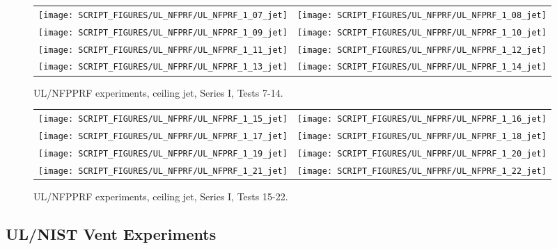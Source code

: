\newpage

\begin{figure}[p]
\begin{tabular*}{\textwidth}{l@{\extracolsep{\fill}}r}
\texttt{[image: SCRIPT\_FIGURES/UL\_NFPRF/UL\_NFPRF\_1\_07\_jet]} &
\texttt{[image: SCRIPT\_FIGURES/UL\_NFPRF/UL\_NFPRF\_1\_08\_jet]} \\
\texttt{[image: SCRIPT\_FIGURES/UL\_NFPRF/UL\_NFPRF\_1\_09\_jet]} &
\texttt{[image: SCRIPT\_FIGURES/UL\_NFPRF/UL\_NFPRF\_1\_10\_jet]} \\
\texttt{[image: SCRIPT\_FIGURES/UL\_NFPRF/UL\_NFPRF\_1\_11\_jet]} &
\texttt{[image: SCRIPT\_FIGURES/UL\_NFPRF/UL\_NFPRF\_1\_12\_jet]} \\
\texttt{[image: SCRIPT\_FIGURES/UL\_NFPRF/UL\_NFPRF\_1\_13\_jet]} &
\texttt{[image: SCRIPT\_FIGURES/UL\_NFPRF/UL\_NFPRF\_1\_14\_jet]}
\end{tabular*}
\caption{UL/NFPPRF experiments, ceiling jet, Series I, Tests 7-14.}
\label{UL_NFPRF_jet_2}
\end{figure}

\begin{figure}[p]
\begin{tabular*}{\textwidth}{l@{\extracolsep{\fill}}r}
\texttt{[image: SCRIPT\_FIGURES/UL\_NFPRF/UL\_NFPRF\_1\_15\_jet]} &
\texttt{[image: SCRIPT\_FIGURES/UL\_NFPRF/UL\_NFPRF\_1\_16\_jet]} \\
\texttt{[image: SCRIPT\_FIGURES/UL\_NFPRF/UL\_NFPRF\_1\_17\_jet]} &
\texttt{[image: SCRIPT\_FIGURES/UL\_NFPRF/UL\_NFPRF\_1\_18\_jet]} \\
\texttt{[image: SCRIPT\_FIGURES/UL\_NFPRF/UL\_NFPRF\_1\_19\_jet]} &
\texttt{[image: SCRIPT\_FIGURES/UL\_NFPRF/UL\_NFPRF\_1\_20\_jet]} \\
\texttt{[image: SCRIPT\_FIGURES/UL\_NFPRF/UL\_NFPRF\_1\_21\_jet]} &
\texttt{[image: SCRIPT\_FIGURES/UL\_NFPRF/UL\_NFPRF\_1\_22\_jet]}
\end{tabular*}
\caption{UL/NFPPRF experiments, ceiling jet, Series I, Tests 15-22.}
\label{UL_NFPRF_jet_3}
\end{figure}


\clearpage

\subsection{UL/NIST Vent Experiments}

